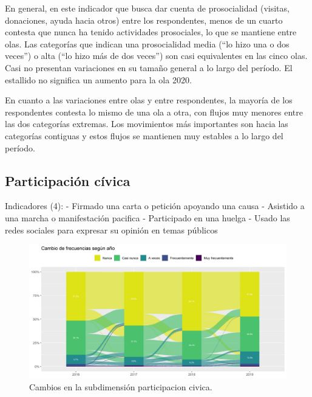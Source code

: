\documentclass[
  12pt,
]{book}
\begin{document}
En general, en este indicador que busca dar cuenta de prosocialidad (visitas, donaciones, ayuda hacia otros) entre los respondentes, menos de un cuarto contesta que nunca ha tenido actividades prosociales, lo que se mantiene entre olas. Las categorías que indican una prosocialidad media (``lo hizo una o dos veces'') o alta (``lo hizo más de dos veces'') son casi equivalentes en las cinco olas. Casi no presentan variaciones en su tamaño general a lo largo del período. El estallido no significa un aumento para la ola 2020.

En cuanto a las variaciones entre olas y entre respondentes, la mayoría de los respondentes contesta lo mismo de una ola a otra, con flujos muy menores entre las dos categorías extremas. Los movimientos más importantes son hacia las categorías contiguas y estos flujos se mantienen muy estables a lo largo del período.

\hypertarget{participaciuxf3n-cuxedvica}{%
\subsection{Participación cívica}\label{participaciuxf3n-cuxedvica}}

Indicadores (4):
- Firmado una carta o petición apoyando una causa
- Asistido a una marcha o manifestación pacifica
- Participado en una huelga
- Usado las redes sociales para expresar su opinión en temas públicos

\begin{figure}[H]

{\centering \includegraphics[width=1\linewidth,height=1\textheight]{output/graphs/alluvial_participacion} 

}

\caption{Cambios en la subdimensión participacion civica.}\label{fig:alluvial-participacion}
\end{figure}
\end{document}
